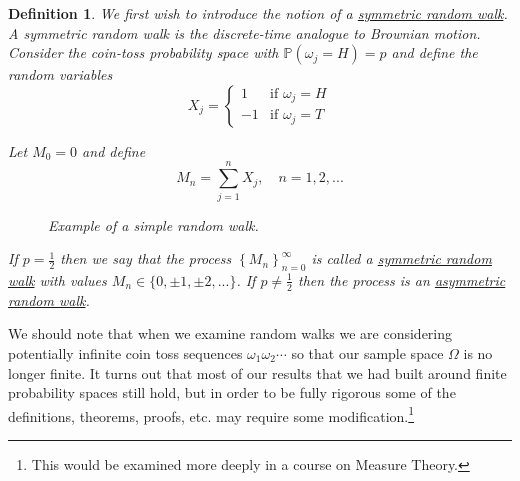 \documentclass[12pt]{article}
\newtheorem{definition}{Definition}
\newlength\tindent
\renewcommand{\indent}{\hspace*{\tindent}}
\renewcommand{\P}{\mathbb P}
\begin{document}
\begin{definition} We first wish to introduce the notion of a \underline{symmetric random walk}. A symmetric random walk is the discrete-time analogue to Brownian motion. Consider the coin-toss probability space with $\P(\omega_j = H) = p$ and define the random variables
\begin{equation*}
	X_j = 
	\begin{cases}
		1 & \text{if } \omega_j = H \\
		-1 & \text{if } \omega_j = T
	\end{cases}
\end{equation*}

Let $M_0 = 0$ and define
\begin{equation*}
	M_n = \sum^n_{j = 1} X_j, \quad n = 1,2,...
\end{equation*}

\begin{figure}[H]
\centering
{}
\caption{Example of a simple random walk.}
\end{figure}

\indent If $p = \frac{1}{2}$ then we say that the process $\left\{ M_n \right\}^\infty_{n = 0}$ is called a \underline{symmetric random walk} with values $M_n \in \{0, \pm 1, \pm 2, ... \}$. If $p \neq \frac{1}{2}$ then the process is an \underline{asymmetric random walk}.
\end{definition}

\indent We should note that when we examine random walks we are considering potentially infinite coin toss sequences $\omega_1\omega_2\cdots$ so that our sample space $\Omega$ is no longer finite. It turns out that most of our results that we had built around finite probability spaces still hold, but in order to be fully rigorous some of the definitions, theorems, proofs, etc. may require some modification.\footnote{This would be examined more deeply in a course on Measure Theory.}
\end{document}
